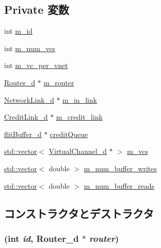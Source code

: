 \subsection*{Private 変数}
\begin{DoxyCompactItemize}
\item 
int \hyperlink{classInputUnit__d_aad966617e7e050bedbead762727808a5}{m\_\-id}
\item 
int \hyperlink{classInputUnit__d_a2e1a9213321dfa0386cdedaf6fc22996}{m\_\-num\_\-vcs}
\item 
int \hyperlink{classInputUnit__d_a2d66b8cad5144408ed492eeff4d37c2f}{m\_\-vc\_\-per\_\-vnet}
\item 
\hyperlink{classRouter__d}{Router\_\-d} $\ast$ \hyperlink{classInputUnit__d_a81d53a65b375007289068e764da769d8}{m\_\-router}
\item 
\hyperlink{classNetworkLink__d}{NetworkLink\_\-d} $\ast$ \hyperlink{classInputUnit__d_a2d8ec8d04bfa5cea2ba42dc25182f6a6}{m\_\-in\_\-link}
\item 
\hyperlink{classCreditLink__d}{CreditLink\_\-d} $\ast$ \hyperlink{classInputUnit__d_a8439db4fc7b7271dfca6bf98b13036a4}{m\_\-credit\_\-link}
\item 
\hyperlink{classflitBuffer__d}{flitBuffer\_\-d} $\ast$ \hyperlink{classInputUnit__d_ab387c0eedaf4adb3f05beb4433c2e033}{creditQueue}
\item 
\hyperlink{classstd_1_1vector}{std::vector}$<$ \hyperlink{classVirtualChannel__d}{VirtualChannel\_\-d} $\ast$ $>$ \hyperlink{classInputUnit__d_a3d476d71a2907d1a278c66e3f6d4733c}{m\_\-vcs}
\item 
\hyperlink{classstd_1_1vector}{std::vector}$<$ double $>$ \hyperlink{classInputUnit__d_a23918c075f01b57d903865de9a74517c}{m\_\-num\_\-buffer\_\-writes}
\item 
\hyperlink{classstd_1_1vector}{std::vector}$<$ double $>$ \hyperlink{classInputUnit__d_a56f67f411b327320655c23f2eaf02b18}{m\_\-num\_\-buffer\_\-reads}
\end{DoxyCompactItemize}


\subsection{コンストラクタとデストラクタ}
\hypertarget{classInputUnit__d_abf9f22df6ddb9792b07be6650ed39e1b}{
\subsubsection[{InputUnit\_\-d}]{ (int {\em id}, \/  {\bf Router\_\-d} $\ast$ {\em router})}}
\label{classInputUnit__d_abf9f22df6ddb9792b07be6650ed39e1b}



